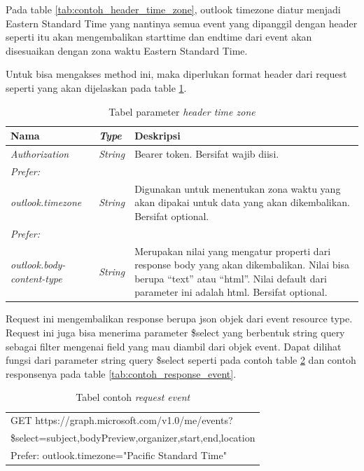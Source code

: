 Pada table \ref{tab:contoh_header_time_zone}, outlook timezone diatur menjadi Eastern Standard Time yang nantinya semua event yang dipanggil dengan header seperti itu akan mengembalikan starttime dan endtime dari event akan disesuaikan dengan zona waktu Eastern Standard Time. 

Untuk bisa mengakses method ini, maka diperlukan format header dari request seperti yang akan dijelaskan pada table \ref{tab:parameter_header_time_zone}. 

\begin{table}[H]
	\centering 
	\caption{Tabel parameter \textit{header time zone}}
	\label{tab:parameter_header_time_zone}
	\begin{tabular}{|p{3cm}|p{3cm}|p{9cm}|}
	\toprule
	 \textbf{Nama} & \textbf{\textit{Type}} & \textbf{Deskripsi}\\ \hline
	 \textit{Authorization} & \textit{String} & Bearer {token}. Bersifat wajib diisi. \\ \hline
	 \textit{Prefer:}& & \\
	 \textit{outlook.timezone} & \textit{String} & Digunakan untuk menentukan zona waktu yang akan dipakai untuk data yang akan dikembalikan. Bersifat optional. \\ \hline
	 \textit{Prefer:}& & \\
	 \textit{outlook.body-content-type} & \textit{String} & Merupakan nilai yang mengatur properti dari response body yang akan dikembalikan. Nilai bisa berupa ``text'' atau ``html''. Nilai default dari parameter ini adalah html. Bersifat optional. \\ \hline
	\bottomrule
	\end{tabular}  
\end{table}

Request ini mengembalikan response berupa json objek dari event resource type. Request ini juga bisa menerima parameter \$select yang berbentuk string query sebagai filter mengenai field yang mau diambil dari objek event. Dapat dilihat fungsi dari parameter string query \$select seperti pada contoh table \ref{tab:contoh_request_event} dan contoh responsenya pada table \ref{tab:contoh_response_event}. 

\begin{table}[H]
	\centering 
	\caption{Tabel contoh \textit{request event}}
	\label{tab:contoh_request_event}
	\begin{tabular}{|p{12cm}|}
	\toprule
	GET https://graph.microsoft.com/v1.0/me/events?\\
	\$select=subject,bodyPreview,organizer,start,end,location\\
	Prefer: outlook.timezone="Pacific Standard Time"\\
	\bottomrule
	\end{tabular}  
\end{table}

